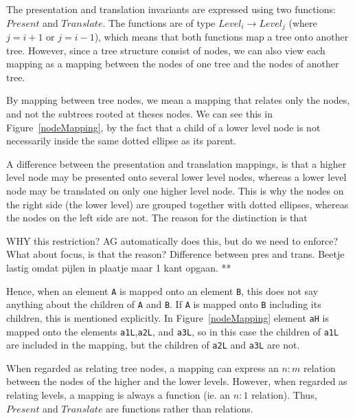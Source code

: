 \bc The presentation and translation invariants are expressed using two functions: $Present$ and $Translate$. The functions are of type $Level_i \rightarrow Level_j$ (where $j = i+1$ or
$j = i-1$), which means that both functions map a tree onto another tree. However, since a tree structure consist of nodes, we can also view each mapping as a mapping between the nodes of one tree and the nodes of another tree.  
\ec

By mapping between tree nodes, we mean a mapping that relates only the nodes, and not the subtrees rooted at theses nodes. We can see this in Figure~\ref{nodeMapping}, by the fact that a child of a lower level node is not necessarily inside the same dotted ellipse as its parent.

A difference between the presentation and translation mappings, is that a higher level node may be presented onto several lower level nodes, whereas a lower level node may be translated on only one higher level node. This is why the nodes on the right side (the lower level) are grouped together with dotted ellipses, whereas the nodes on the left side are not. The reason for the distinction is that 
\toHere     %


WHY this restriction? AG automatically does this, but do we need to enforce? What about focus, is that the reason?
Difference between pres and trans. Beetje lastig omdat pijlen in plaatje maar 1 kant opgaan.
**
\toHere     %


\bc
Hence, when an element \verb|A| is mapped onto an element \verb|B|, this does not say anything about the children of \verb|A| and \verb|B|. If \verb|A| is mapped onto \verb|B| including its children, this is mentioned explicitly. In Figure~\ref{nodeMapping} element \verb|aH| is mapped onto the elements \verb|a1L|,\verb|a2L|, and \verb|a3L|, so in this case the children of \verb|a1L| are included in the mapping, but the children of \verb|a2L| and \verb|a3L| are not. 
\ec

\bc
When regarded as relating tree nodes, a mapping can express an $n:m$ relation between the nodes of the higher and the lower levels. However, when regarded as relating levels, a mapping is always a function (ie. an $n:1$ relation). Thus, $Present$ and $Translate$ are functions rather than relations.
\ec

